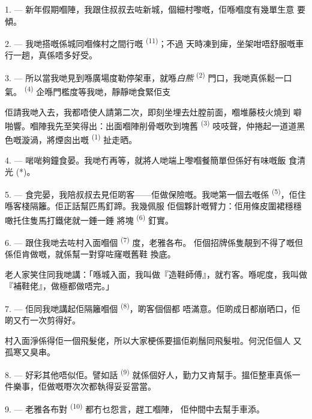 \VUsaut{4.0mm}

1. --- 新年假期嗰陣，我跟住叔叔去咗新城，個細村嚟嘅，佢喺嗰度有幾單生意
要傾。

2. --- 我哋搭嘅係城同嗰條村之間行嘅 \textsuperscript{(11)}；不過
天時凍到痺，坐架咁唔舒服嘅車行一趟，真係唔多好受。

3. --- 所以當我哋見到喺廣場度勒停架車，就喺\textit{白熊}
 \textsuperscript{(2)} 門口，我哋真係鬆一口氣。
\textsuperscript{(4)} 企喺門檻度等我哋，靜靜哋食緊佢支

佢請我哋入去，我都唔使人請第二次，即刻坐埋去灶膛前面，嗰堆藤枝火燒到
噼啪響。嗰陣我先至笑得出：出面嗰陣削骨嘅吹到塊舊
\textsuperscript{(3)} 吱吱聲，仲捲起一道道黑色嘅漩渦，將煙囪出嘅
\textsuperscript{(1)} 扯走晒。

4. --- 啱啱夠鐘食晏。我哋冇再等，就將人哋端上嚟嗰餐簡單但係好有味嘅飯
食清光 (*)。

\VUsaut{3.0mm}

5. --- 食完晏，我陪叔叔去見佢啲客——佢做保險嘅。我哋第一個去嘅係
 \textsuperscript{(5)}，佢住喺客棧隔籬。佢正話幫匹馬釘蹄。我幾佩服
佢個夥計嘅臂力：佢用條皮圍裙穩穩噉托住隻馬打鐵佬就一錘一錘
將塊 \textsuperscript{(6)} 釘實。

6. --- 跟住我哋去咗村入面嗰個 \textsuperscript{(7)} 度，老雅各布。
佢個招牌係隻靚到不得了嘅但係佢肯做嘅，就係幫一對穿咗窿嘅舊鞋
換底。

老人家笑住同我哋講：「喺城入面，我叫做『造鞋師傅』，就冇客。喺呢度，我叫做
『補鞋佬』，做極都做唔完。」

7. --- 佢同我哋講起佢隔籬嗰個 \textsuperscript{(8)}，啲客個個都
唔滿意。佢啲成日都崩晒口，佢啲又冇一次剪得好。

村入面淨係得佢一個飛髮佬，所以大家梗係要搵佢剃鬚同飛髮啦。何況佢個人
又孤寒又臭串。

8. --- 好彩其他唔似佢。譬如話 \textsuperscript{(9)}
就係個好人，勤力又肯幫手。搵佢整車真係一件樂事，佢做嘅嘢次次都執得妥妥當當。

9. --- 老雅各布對 \textsuperscript{(10)} 都冇乜怨言，趕工嗰陣，
佢仲間中去幫手車添。

